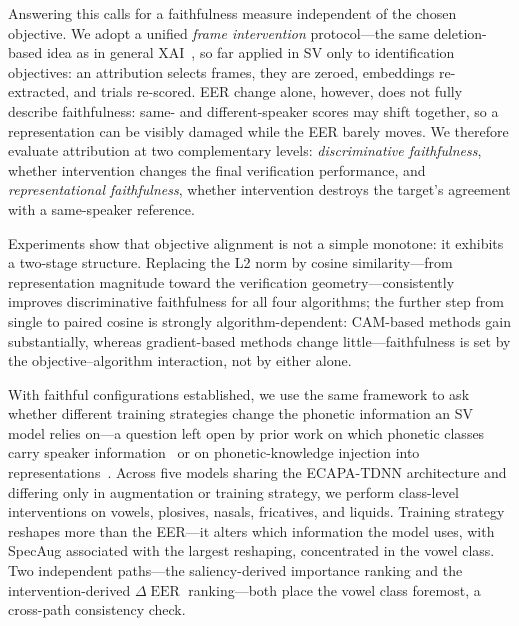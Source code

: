 \documentclass{article}
\DeclareMathOperator{\EER}{EER}
\newcommand{\dEER}{\Delta\EER}
\begin{document}
Answering this calls for a faithfulness measure independent of the chosen objective. We adopt a unified \emph{frame intervention} protocol---the same deletion-based idea as in general XAI~\cite{petsiuk2018rise,deyoung2020eraser}, so far applied in SV only to identification objectives: an attribution selects frames, they are zeroed, embeddings re-extracted, and trials re-scored. EER change alone, however, does not fully describe faithfulness: same- and different-speaker scores may shift together, so a representation can be visibly damaged while the EER barely moves. We therefore evaluate attribution at two complementary levels: \emph{discriminative faithfulness}, whether intervention changes the final verification performance, and \emph{representational faithfulness}, whether intervention destroys the target's agreement with a same-speaker reference.

Experiments show that objective alignment is not a simple monotone: it exhibits a two-stage structure. Replacing the L2 norm by cosine similarity---from representation magnitude toward the verification geometry---consistently improves discriminative faithfulness for all four algorithms; the further step from single to paired cosine is strongly algorithm-dependent: CAM-based methods gain substantially, whereas gradient-based methods change little---faithfulness is set by the objective--algorithm interaction, not by either alone.

With faithful configurations established, we use the same framework to ask whether different training strategies change the phonetic information an SV model relies on---a question left open by prior work on which phonetic classes carry speaker information~\cite{li2024phonemes,benamor2023describing} or on phonetic-knowledge injection into representations~\cite{liu2019phonetic,song2024multilingual,ma2025phinet}. Across five models sharing the ECAPA-TDNN architecture and differing only in augmentation or training strategy, we perform class-level interventions on vowels, plosives, nasals, fricatives, and liquids. Training strategy reshapes more than the EER---it alters which information the model uses, with SpecAug associated with the largest reshaping, concentrated in the vowel class. Two independent paths---the saliency-derived importance ranking and the intervention-derived $\dEER$ ranking---both place the vowel class foremost, a cross-path consistency check.
\end{document}
